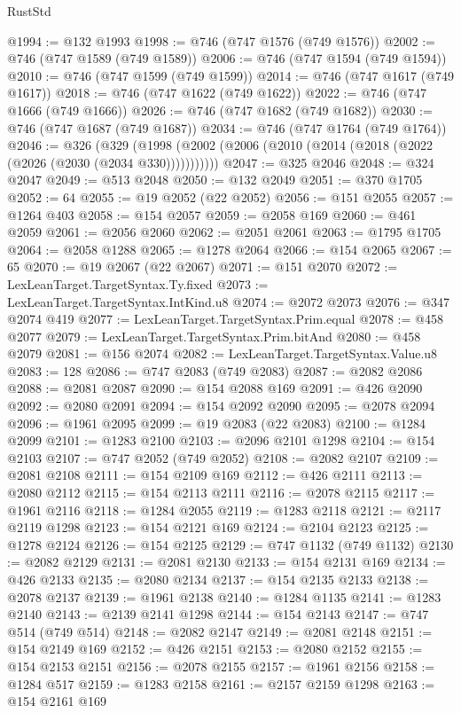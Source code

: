 \begin{lexlean}{RustStd}
\begin{coremodule}
@1994 := @132 @1993
@1998 := @746 (@747 @1576 (@749 @1576))
@2002 := @746 (@747 @1589 (@749 @1589))
@2006 := @746 (@747 @1594 (@749 @1594))
@2010 := @746 (@747 @1599 (@749 @1599))
@2014 := @746 (@747 @1617 (@749 @1617))
@2018 := @746 (@747 @1622 (@749 @1622))
@2022 := @746 (@747 @1666 (@749 @1666))
@2026 := @746 (@747 @1682 (@749 @1682))
@2030 := @746 (@747 @1687 (@749 @1687))
@2034 := @746 (@747 @1764 (@749 @1764))
@2046 := @326
    (@329 (@1998 (@2002 (@2006 (@2010 (@2014 (@2018 (@2022 (@2026 (@2030 (@2034 @330)))))))))))
@2047 := @325 @2046
@2048 := @324 @2047
@2049 := @513 @2048
@2050 := @132 @2049
@2051 := @370 @1705
@2052 := 64
@2055 := @19 @2052 (@22 @2052)
@2056 := @151 @2055
@2057 := @1264 @403
@2058 := @154 @2057
@2059 := @2058 @169
@2060 := @461 @2059
@2061 := @2056 @2060
@2062 := @2051 @2061
@2063 := @1795 @1705
@2064 := @2058 @1288
@2065 := @1278 @2064
@2066 := @154 @2065
@2067 := 65
@2070 := @19 @2067 (@22 @2067)
@2071 := @151 @2070
@2072 := LexLeanTarget.TargetSyntax.Ty.fixed
@2073 := LexLeanTarget.TargetSyntax.IntKind.u8
@2074 := @2072 @2073
@2076 := @347 @2074 @419
@2077 := LexLeanTarget.TargetSyntax.Prim.equal
@2078 := @458 @2077
@2079 := LexLeanTarget.TargetSyntax.Prim.bitAnd
@2080 := @458 @2079
@2081 := @156 @2074
@2082 := LexLeanTarget.TargetSyntax.Value.u8
@2083 := 128
@2086 := @747 @2083 (@749 @2083)
@2087 := @2082 @2086
@2088 := @2081 @2087
@2090 := @154 @2088 @169
@2091 := @426 @2090
@2092 := @2080 @2091
@2094 := @154 @2092 @2090
@2095 := @2078 @2094
@2096 := @1961 @2095
@2099 := @19 @2083 (@22 @2083)
@2100 := @1284 @2099
@2101 := @1283 @2100
@2103 := @2096 @2101 @1298
@2104 := @154 @2103
@2107 := @747 @2052 (@749 @2052)
@2108 := @2082 @2107
@2109 := @2081 @2108
@2111 := @154 @2109 @169
@2112 := @426 @2111
@2113 := @2080 @2112
@2115 := @154 @2113 @2111
@2116 := @2078 @2115
@2117 := @1961 @2116
@2118 := @1284 @2055
@2119 := @1283 @2118
@2121 := @2117 @2119 @1298
@2123 := @154 @2121 @169
@2124 := @2104 @2123
@2125 := @1278 @2124
@2126 := @154 @2125
@2129 := @747 @1132 (@749 @1132)
@2130 := @2082 @2129
@2131 := @2081 @2130
@2133 := @154 @2131 @169
@2134 := @426 @2133
@2135 := @2080 @2134
@2137 := @154 @2135 @2133
@2138 := @2078 @2137
@2139 := @1961 @2138
@2140 := @1284 @1135
@2141 := @1283 @2140
@2143 := @2139 @2141 @1298
@2144 := @154 @2143
@2147 := @747 @514 (@749 @514)
@2148 := @2082 @2147
@2149 := @2081 @2148
@2151 := @154 @2149 @169
@2152 := @426 @2151
@2153 := @2080 @2152
@2155 := @154 @2153 @2151
@2156 := @2078 @2155
@2157 := @1961 @2156
@2158 := @1284 @517
@2159 := @1283 @2158
@2161 := @2157 @2159 @1298
@2163 := @154 @2161 @169

\end{coremodule}
\end{lexlean}
